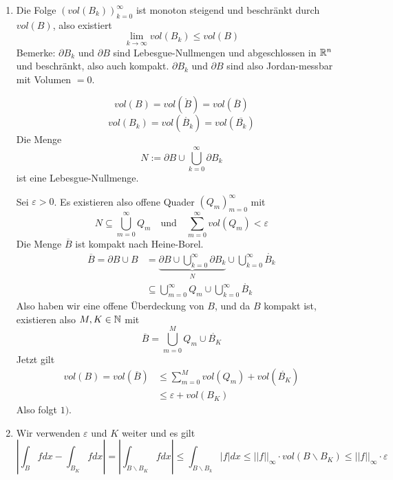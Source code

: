 \documentclass[main.tex]{subfiles}
\begin{document}
\begin{Beweis}
  \begin{enumerate}
    \item Die Folge $(vol(B_k))_{k = 0}^\infty$ ist monoton steigend und beschränkt durch $vol(B)$, also existiert
      $$\lim \limits_{k \to \infty} vol(B_k) \leq vol(B)$$
      Bemerke: $\partial B_k$ und $\partial B$ sind Lebesgue-Nullmengen und abgeschlossen in $\mathbb{R}^n$ und beschränkt, also auch kompakt. $\partial B_k$ und $\partial B$ sind also Jordan-messbar mit Volumen $= 0$.

      $$vol(B) = vol(\mathring{B}) = vol(\overline{B})$$
      $$vol(B_k) = vol(\mathring{B_k}) = vol(\overline{B_k})$$
      Die Menge
      $$N := \partial B \cup \bigcup_{k = 0}^\infty \partial B_k$$
      ist eine Lebesgue-Nullmenge.

      Sei $\varepsilon > 0$. Es existieren also offene Quader $(Q_m)_{m = 0}^\infty$ mit
      $$N \subseteq \bigcup_{m = 0}^\infty Q_m \quad \text{und} \quad \sum \limits_{m = 0}^\infty vol(Q_m) < \varepsilon$$
      Die Menge $\overline{B}$ ist kompakt nach Heine-Borel.
      $$\begin{aligned}
        \overline{B} = \partial B \cup B & = \underbrace{\partial B \cup \bigcup_{k = 0}^\infty \partial B_k}_{N} \cup \bigcup_{k = 0}^\infty \mathring{B_k}\\
        & \subseteq \bigcup_{m = 0}^\infty Q_m \cup \bigcup_{k = 0}^\infty \mathring{B_k}
      \end{aligned}$$
      Also haben wir eine offene Überdeckung von $B$, und da $B$ kompakt ist, existieren also $M,K \in \mathbb{N}$ mit
      $$\overline{B} =  \bigcup_{m = 0}^M Q_m \cup \mathring{B_K}$$
      Jetzt gilt
      $$\begin{aligned}
        vol(B) = vol(\overline{B}) & \leq \sum \limits_{m=0}^M vol(Q_m) + vol(\mathring{B_K}) \\
        & \leq \varepsilon + vol(B_K)
      \end{aligned}$$
      Also folgt $1)$.
    \item Wir verwenden $\varepsilon$ und $K$ weiter und es gilt
      $$ \left|\int_B fdx - \int_{B_K}fdx \right| = \left|\int_{B \backslash B_K} fdx\right| \leq \int_{B \backslash B_k} |f| dx \leq ||f||_\infty \cdot vol(B \backslash B_K) \leq ||f||_\infty \cdot \varepsilon$$
  \end{enumerate}
\end{Beweis}
\end{document}
